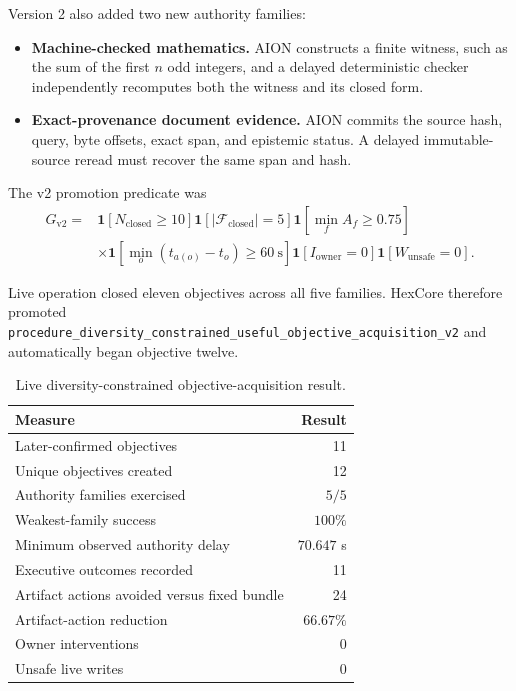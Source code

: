 Version 2 also added two new authority families:
\begin{itemize}[leftmargin=*]
    \item \textbf{Machine-checked mathematics.} AION constructs a finite
          witness, such as the sum of the first $n$ odd integers, and a delayed
          deterministic checker independently recomputes both the witness and
          its closed form.
    \item \textbf{Exact-provenance document evidence.} AION commits the source
          hash, query, byte offsets, exact span, and epistemic status.  A delayed
          immutable-source reread must recover the same span and hash.
\end{itemize}

The v2 promotion predicate was
\begin{equation}
\begin{aligned}
G_{\mathrm{v2}}={}&
\mathbf{1}\!\left[N_{\mathrm{closed}}\geq 10\right]
\mathbf{1}\!\left[|\mathcal{F}_{\mathrm{closed}}|=5\right]
\mathbf{1}\!\left[\min_f A_f\geq 0.75\right] \\
&\times
\mathbf{1}\!\left[\min_o(t_{a(o)}-t_o)\geq 60\ \mathrm{s}\right]
\mathbf{1}\!\left[I_{\mathrm{owner}}=0\right]
\mathbf{1}\!\left[W_{\mathrm{unsafe}}=0\right].
\end{aligned}
\label{eq:aion-v2-promotion-gate}
\end{equation}

Live operation closed eleven objectives across all five families.  HexCore
therefore promoted
\texttt{procedure\_diversity\_constrained\_useful\_objective\_acquisition\_v2}
and automatically began objective twelve.

\begin{table}[htbp]
\centering
\caption{Live diversity-constrained objective-acquisition result.}
\label{tab:aion-diversity-v2-results}
\begin{tabularx}{\textwidth}{@{}>{\raggedright\arraybackslash}Xr@{}}
\toprule
Measure & Result \\
\midrule
Later-confirmed objectives & 11 \\
Unique objectives created & 12 \\
Authority families exercised & $5/5$ \\
Weakest-family success & $100\%$ \\
Minimum observed authority delay & $70.647$ s \\
Executive outcomes recorded & 11 \\
Artifact actions avoided versus fixed bundle & 24 \\
Artifact-action reduction & $66.67\%$ \\
Owner interventions & 0 \\
Unsafe live writes & 0 \\
\bottomrule
\end{tabularx}
\end{table}

